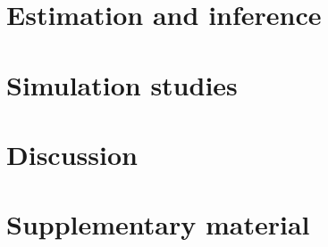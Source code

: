 \documentclass[a4paper,12pt]{article}
\begin{document}
\section{Estimation and inference}
\label{inference}

\section{Simulation studies}
\label{simulation}

\section{Discussion}
\label{discussion}

\section*{Supplementary material}



\end{document}
